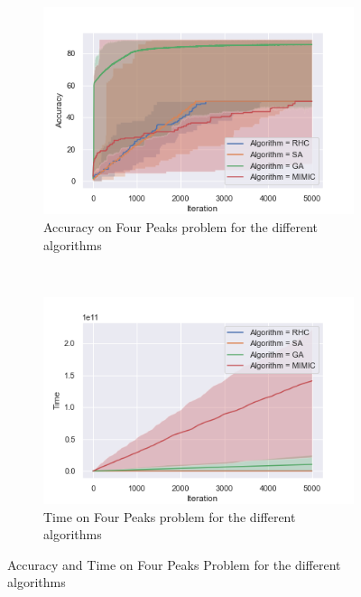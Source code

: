\documentclass[10pt]{article}
\begin{document}
				\begin{figure}[h]
					\centering
					\begin{subfigure}[t]{0.45\columnwidth}
						\centering
						\includegraphics[width=\linewidth]{../graphics/four_peaks_all_Iteration_Error_Algorithm.png}
						\caption{Accuracy on Four Peaks problem for the different algorithms}
						\label{fp:all_accuracy}
					\end{subfigure}
					~
					\begin{subfigure}[t]{0.45\columnwidth}
						\centering
						\includegraphics[width=\linewidth]{../graphics/four_peaks_all_Iteration_Time_Algorithm.png}
						\caption{Time on Four Peaks problem for the different algorithms}
						\label{fp:all_time}
					\end{subfigure}
					\caption{Accuracy and Time on Four Peaks Problem for the different algorithms}
					\label{fp:all}
				\end{figure}
\end{document}
